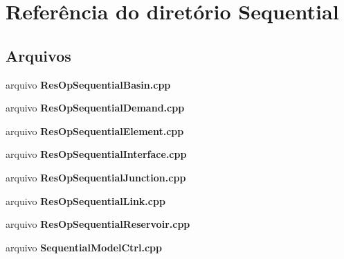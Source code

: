 \section{Referência do diretório Sequential}
\label{dir_d40f15cbec74a12742b28a17fd4f9c69}
\subsection*{Arquivos}
\begin{DoxyCompactItemize}
\item 
arquivo {\bf Res\+Op\+Sequential\+Basin.\+cpp}
\item 
arquivo {\bf Res\+Op\+Sequential\+Demand.\+cpp}
\item 
arquivo {\bf Res\+Op\+Sequential\+Element.\+cpp}
\item 
arquivo {\bf Res\+Op\+Sequential\+Interface.\+cpp}
\item 
arquivo {\bf Res\+Op\+Sequential\+Junction.\+cpp}
\item 
arquivo {\bf Res\+Op\+Sequential\+Link.\+cpp}
\item 
arquivo {\bf Res\+Op\+Sequential\+Reservoir.\+cpp}
\item 
arquivo {\bf Sequential\+Model\+Ctrl.\+cpp}
\end{DoxyCompactItemize}
